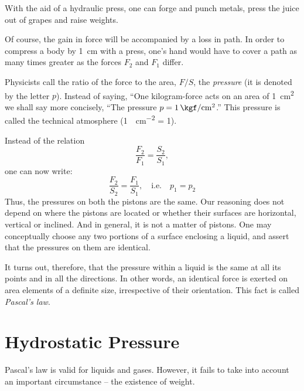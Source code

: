 With the aid of a hydraulic press, one can forge and
punch metals, press the juice out of grapes and raise
weights.

Of course, the gain in force will be accompanied by a loss in path. In order to compress a body by \SI{1}{\centi\meter} with a press, one's hand would have to cover a path as many times greater as the forces $F_{2}$ and $F_{1}$ differ.

Physicists call the ratio of the force to the area, $F/S$, the \emph{pressure} (it is denoted by the letter $p$). Instead of saying, ``One kilogram-force acts on an area of  \SI{1}{\centi\meter\squared} we shall say more concisely, ``The pressure $p = \SI{1}{\kgf\per\centi\meter\squared}$.'' This pressure is called the technical atmosphere (\SI{1}{\kgf\per\centi\meter\squared} = \SI{1}{\atmos}).

Instead of the relation 
\begin{equation*}%
\dfrac{F_{2}}{F_{1}} =\dfrac{S_{2}}{S_{1}},
\end{equation*}
one can now write:
\begin{equation*}%
\dfrac{F_{2}}{S_{2}} =\dfrac{F_{1}}{S_{1}}, \quad \textrm{i.e.} \quad p_{1}=p_{2}
\end{equation*}
Thus, the pressures on both the pistons are the same. Our reasoning does not depend on where the pistons are located or whether their surfaces are horizontal, vertical or inclined. And in general, it is not a matter of pistons. One may conceptually choose any two portions of a surface enclosing a liquid, and assert that the pressures on them are identical.

It turns out, therefore, that the pressure within a liquid is the same at all its points and in all the directions. In other words, an identical force is exerted on area elements of a definite size, irrespective of their orientation. This fact is called \emph{Pascal's law}.

\section{Hydrostatic Pressure}
Pascal's law is valid for liquids and gases. However, it fails to take into account an important circumstance -- the existence of weight.

